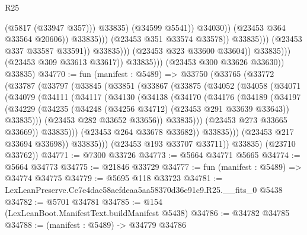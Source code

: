 \begin{lexlean}{R25}
\begin{coremodule}
                                                          (@5817 (@33947 @357)))
                                                        @33835)
                                                      (@34599 @5541))
                                                    @34030))
                                                (@23453 @364 @33564 @20606))
                                              @33835)))
                                        (@23453 @351 @33574 @33578))
                                      @33835)))
                                (@23453 @337 @33587 @33591))
                              @33835)))
                        (@23453 @323 @33600 @33604))
                      @33835)))
                (@23453 @309 @33613 @33617))
              @33835)))
        (@23453 @300 @33626 @33630))
      @33835)
@34770 := fun (manifest : @5489) =>
  @33750
    (@33765
      (@33772
        (@33787
          (@33797
            (@33845
              (@33851
                (@33867
                  (@33875
                    (@34052
                      (@34058
                        (@34071
                          (@34079
                            (@34111
                              (@34117
                                (@34130
                                  (@34138
                                    (@34170
                                      (@34176
                                        (@34189
                                          (@34197
                                            (@34229
                                              (@34235
                                                (@34248 (@34256 @34712) (@23453 @291 @33639 @33643))
                                                @33835)))
                                          (@23453 @282 @33652 @33656))
                                        @33835)))
                                  (@23453 @273 @33665 @33669))
                                @33835)))
                          (@23453 @264 @33678 @33682))
                        @33835)))
                  (@23453 @217 @33694 @33698))
                @33835)))
          (@23453 @193 @33707 @33711))
        @33835)
      (@23710 @33762))
@34771 := @7300 @33726
@34773 := @5664 @34771 @5665
@34774 := @5664 @34773
@34775 := @21846 @33729
@34777 := fun (manifest : @5489) => @34774 @34775
@34779 := @5695 @118 @33723
@34781 := LexLeanPreserve.Ce7e4dac58aefdeaa5aa58370d36e91c9.R25.__fits_0 @5438
@34782 := @5701 @34781
@34785 := @154 (LexLeanBoot.ManifestText.buildManifest @5438)
@34786 := @34782 @34785
@34788 := (manifest : @5489) -> @34779 @34786

\end{coremodule}
\end{lexlean}
